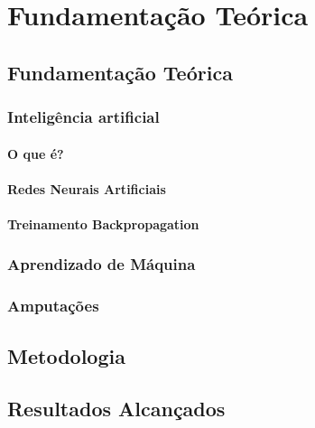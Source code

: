 \part{Fundamentação Teórica}
\chapter[Fundamentação Teórica]{Fundamentação Teórica}

\section{Inteligência artificial}
    \subsection{O que é?}
        
    \subsection{Redes Neurais Artificiais}
        
    \subsection{Treinamento Backpropagation}
        

\section{Aprendizado de Máquina}
    

\section{Amputações}
    

\chapter[Metodologia]{Metodologia}
    

\chapter{Resultados Alcançados}
    